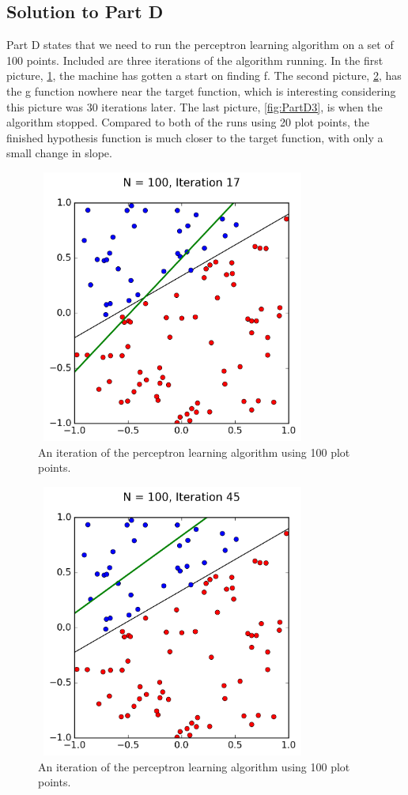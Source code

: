 \documentclass[a4paper]{article}
\begin{document}
\subsection{Solution to Part D}
Part D states that we need to run the perceptron learning algorithm on a set of 100 points. Included are three iterations of the algorithm running. In the first picture, \ref{fig:PartD1}, the machine has gotten a start on finding f. The second picture, \ref{fig:PartD2}, has the g function nowhere near the target function, which is interesting considering this picture was 30 iterations later.  The last picture, \ref{fig:PartD3}, is when the algorithm stopped. Compared to both of the runs using 20 plot points, the finished hypothesis function is much closer to the target function, with only a small change in slope.  
\begin{figure}
  \includegraphics[width=9cm,height=9cm]{p_N100_it17.png}
  \caption{An iteration of the perceptron learning algorithm using 100 plot points.}
  \label{fig:PartD1}
\end{figure}
\begin{figure}
  \includegraphics[width=9cm,height=9cm]{p_N100_it45.png}
  \caption{An iteration of the perceptron learning algorithm using 100 plot points.}
  \label{fig:PartD2}
\end{figure}
\end{document}
